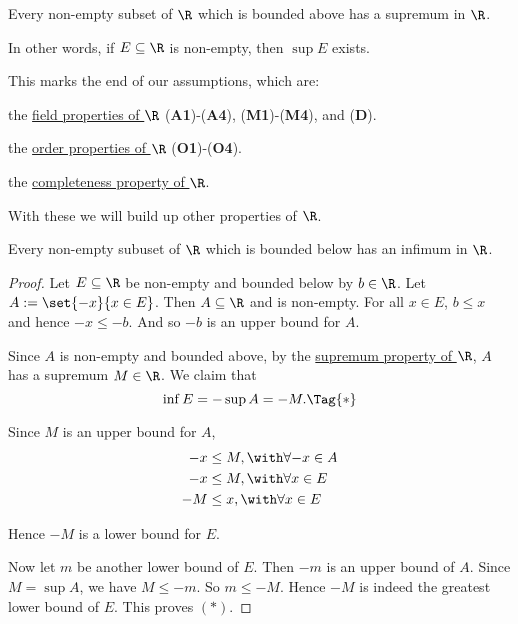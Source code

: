 \label{f330cf9}

Every non-empty subset of $\R$ which is bounded above has a supremum in $\R$.

In other words, if $E\subseteq\R$ is non-empty, then $\sup E$ exists.

\label{b1dc879}

This marks the end of our assumptions, which are:

\begin{enumerati}
  \item the \href{bf61f02}{field properties of $\R$} (\textbf{A1})-(\textbf{A4}),
  (\textbf{M1})-(\textbf{M4}), and (\textbf{D}).
  \item the \href{d49c63e}{order properties of $\R$} (\textbf{O1})-(\textbf{O4}).
  \item the \href{f330cf9}{completeness property of $\R$}.
\end{enumerati}

With these we will build up other properties of $\R$.

\label{ab2a2fe}

Every non-empty subuset of $\R$ which is bounded below has an infimum in $\R$.

\begin{proof}

  Let $E\subseteq\R$ be non-empty and bounded below by $b\in\R$. Let
  $A:=\set{-x}{x\in E}$. Then $A\subseteq\R$ and is non-empty. For all $x\in E$,
  $b\leq x$ and hence $-x\leq-b$. And so $-b$ is an upper bound for $A$.

  Since $A$ is non-empty and bounded above, by the \href{f330cf9}{supremum
  property of $\R$}, $A$ has a supremum $M\in\R$. We claim that
  \begin{equation*}
    \inf E=-\sup A=-M.\Tag{*}
  \end{equation*}

  Since $M$ is an upper bound for $A$,
  \begin{align*}
    -x &\leq M,\with\forall{-x}\in A \\
    -x &\leq M,\with\forall{x}\in E  \\
    -M &\leq x,\with\forall{x}\in E
  \end{align*}

  Hence $-M$ is a lower bound for $E$.

  Now let $m$ be another lower bound of $E$. Then $-m$ is an upper bound of $A$.
  Since $M=\sup A$, we have $M\leq-m$. So $m\leq-M$. Hence $-M$ is indeed the
  greatest lower bound of $E$. This proves $(*)$.
\end{proof}

